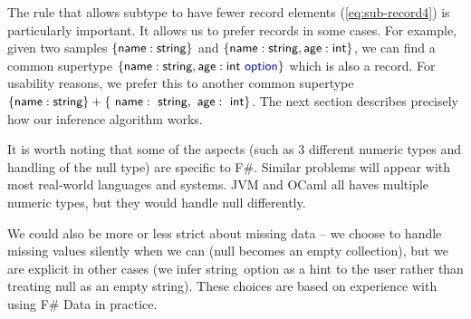 \documentclass[preprint]{sigplanconf}
\newcommand{\kvd}[1]{\textnormal{\textcolor{kvdclr}{\sffamily #1}}}
\newcommand{\ident}[1]{\textnormal{\sffamily #1}}
\begin{document}
\noindent
The rule that allows subtype to have fewer record elements (\ref{eq:sub-record4}) is particularly
important. It allows us to prefer records in some cases. For example, given two samples 
$\{ \ident{name}:\ident{string} \}$ and $\{ \ident{name}:\ident{string}, \ident{age}:\ident{int} \}$,
we can find a common supertype $\{ \ident{name}:\ident{string}, \ident{age}:\ident{int}~\kvd{option} \}$
which is also a record. For usability reasons, we prefer this to another common supertype
$\{ \ident{name}:\ident{string} \} + \{ \ident{name}:\ident{string}, \ident{age}:\ident{int} \}$.
The next section describes precisely how our inference algorithm works.

It is worth noting that some of the aspects (such as 3 different numeric types and handling of 
the \kvd{null} type) are specific to F\#. Similar problems will appear with most real-world
languages and systems. JVM and OCaml all haves multiple numeric types, but they would handle \kvd{null}
differently. 

We could also be more or less strict about missing data -- we choose to handle missing values 
silently when we can (\kvd{null} becomes an empty collection), but we are explicit in other cases 
(we infer \ident{string}~\kvd{option} as a hint to the user rather than treating \kvd{null} as an 
empty string). These choices are based on experience with using F\# Data in practice.

\end{document}
